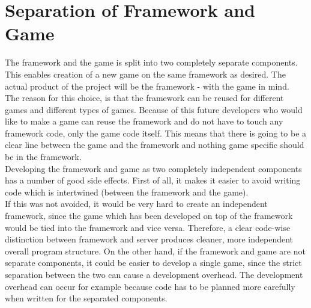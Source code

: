 \section{Separation of Framework and Game}
The framework and the game is split into two completely separate components. This enables creation of a new game on the same framework as desired.  The actual product of the project will be the framework - with the game in mind.
\\

The reason for this choice, is that the framework can be reused for different games and different types of games. Because of this future developers who would like to make a game can reuse the framework and do not have to touch any framework code, only the game code itself. This means that there is going to be a clear line between the game and the framework and nothing game specific should be in the framework.
\\
Developing the framework and game as two completely independent components has a number of good side effects. First of all, it makes it easier to avoid writing code which is intertwined (between the framework and the game).\\

If this was not avoided, it would be very hard to create an independent framework, since the game which has been developed on top of the framework would be tied into the framework and vice versa. Therefore, a clear code-wise distinction between framework and server produces cleaner, more independent overall program structure. On the other hand, if the framework and game are not separate components, it could be easier to develop a single game, since the strict separation between the two can cause a development overhead. The development overhead can occur for example because code has to be planned more carefully when written for the separated components.\\

